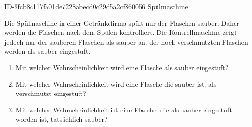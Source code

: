 \begin{exercise}
      {ID-8fcb8c117fa01de7228abecd0c29d5a2cf860056}
      {Spülmaschine}
  \ifproblem\problem\par
    Die Spülmaschine in einer Getränkefirma spült nur  der Flaschen
    sauber. Daher werden die Flaschen nach dem Spülen kontrolliert. Die
    Kontrollmaschine zeigt jedoch nur  der sauberen Flaschen als
    sauber an.  der noch verschmutzten Flaschen werden als sauber
    eingestuft.
    \begin{enumerate}
      \item Mit welcher Wahrscheinlichkeit wird eine Flasche als sauber
            eingestuft?
      \item Mit welcher Wahrscheinlichkeit wird eine Flasche die sauber
            ist, als verschmutzt eingestuft?
      \item Mit welcher Wahrscheinlichkeit ist eine Flasche, die als
            sauber eingestuft worden ist, tatsächlich sauber?
    \end{enumerate}
  \fi
\end{exercise}
